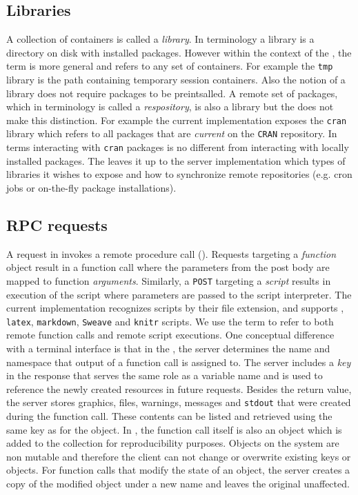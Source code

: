 \subsection{Libraries}

A collection of containers is called a \emph{library}. In \R terminology a library is a directory on disk with installed packages. However within the context of the \API, the term is more general and refers to any set of containers. For example the \texttt{tmp} library is the \API path containing temporary session containers. Also the \API notion of a library does not require packages to be preintsalled. A remote set of packages, which in \R terminology is called a \emph{respository}, is also a library but the \API does not make this distinction. For example the current implementation exposes the \texttt{cran} library which refers to all packages that are \emph{current} on the \texttt{CRAN} repository. In \API terms interacting with \texttt{cran} packages is no different from interacting with locally installed packages. The \API leaves it up to the server implementation which types of libraries it wishes to expose and how to synchronize remote repositories (e.g. cron jobs or on-the-fly package installations).

\subsection{RPC requests}

A \POST request in \OpenCPU invokes a remote procedure call (\RPC). Requests targeting a \emph{function} object result in a function call where the \HTTP parameters from the post body are mapped to function \emph{arguments}. Similarly, a \texttt{POST} targeting a \emph{script} results in execution of the script where \HTTP parameters are passed to the script interpreter. The current \OpenCPU implementation recognizes scripts by their file extension, and supports \R, \texttt{latex}, \texttt{markdown}, \texttt{Sweave} and \texttt{knitr} scripts. We use the term \RPC to refer to both remote function calls and remote script executions. One conceptual difference with a terminal interface is that in the \OpenCPU \API, the server determines the name and namespace that output of a function call is assigned to. The server includes a \emph{key} in the \RPC response that serves the same role as a variable name and is used to reference the newly created resources in future requests. Besides the return value, the server stores graphics, files, warnings, messages and \texttt{stdout} that were created during the function call. These contents can be listed and retrieved using the same key as for the object. In \R, the function call itself is also an object which is added to the collection for reproducibility purposes. Objects on the system are non mutable and therefore the client can not change or overwrite existing keys or objects. For function calls that modify the state of an object, the server creates a copy of the modified object under a new name and leaves the original unaffected.

